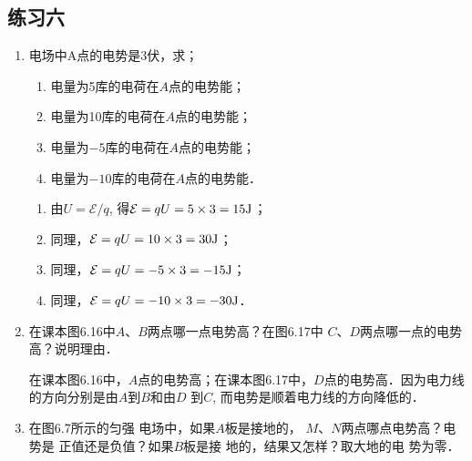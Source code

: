 \subsection{练习六}

\begin{enumerate}
	\item 电场中A点的电势是3伏，求；
	\begin{enumerate}
		\item 电量为5库的电荷在$A$点的电势能；
		\item 电量为10库的电荷在$A$点的电势能；
		\item 电量为$-5$库的电荷在$A$点的电势能；
		\item 电量为$-10$库的电荷在$A$点的电势能．
	\end{enumerate}

    \begin{solution}
\begin{enumerate}
    \item 由$U=\mathcal{E}/q$, 得$\mathcal{E}=qU=5\times3=15{\rm J}$；
    \item 同理，$\mathcal{E}=qU=10\times3=30{\rm J}$；
    \item 同理，$\mathcal{E}=qU=-5\times3=-15{\rm J}$；
    \item 同理，$\mathcal{E}=qU=-10\times3=-30{\rm J}$．
\end{enumerate}
    \end{solution}
    
	\item 在课本图6.16中$A$、$B$两点哪一点电势高？在图6.17中
$C$、$D$两点哪一点的电势高？说明理由．


\begin{solution}
    在课本图6.16中，$A$点的电势高；在课本图6.17中，$D$点的电势高．因为电力线的方向分别是由$A$到$B$和由$D$
    到$C$, 而电势是顺着电力线的方向降低的．
\end{solution}

\item 在图6.7所示的匀强
电场中，如果$A$板是接地的，
$M$、$N$两点哪点电势高？电势是
正值还是负值？如果$B$板是接
地的，结果又怎样？取大地的电
势为零．

\begin{figure}[htp]\centering
    \caption{}
\end{figure}	



\end{enumerate}
